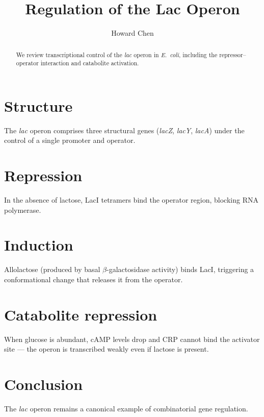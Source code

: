 \documentclass{article}
\title{Regulation of the Lac Operon}
\author{Howard Chen}
\begin{document}
\maketitle

\begin{abstract}
We review transcriptional control of the \textit{lac} operon in \textit{E.\ coli}, including the repressor--operator interaction and catabolite activation.
\end{abstract}

\section{Structure}
The \textit{lac} operon comprises three structural genes (\textit{lacZ}, \textit{lacY}, \textit{lacA}) under the control of a single promoter and operator.

\section{Repression}
In the absence of lactose, LacI tetramers bind the operator region, blocking RNA polymerase.

\section{Induction}
Allolactose (produced by basal $\beta$-galactosidase activity) binds LacI, triggering a conformational change that releases it from the operator.

\section{Catabolite repression}
When glucose is abundant, cAMP levels drop and CRP cannot bind the activator site — the operon is transcribed weakly even if lactose is present.

\section{Conclusion}
The \textit{lac} operon remains a canonical example of combinatorial gene regulation.
\end{document}
